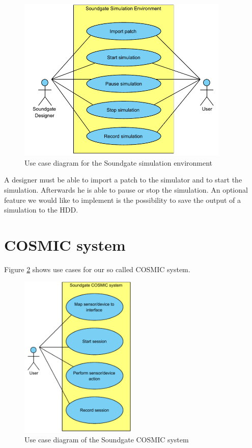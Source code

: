 	\begin{figure}[!h]
		\centering
			\includegraphics[width=0.90\textwidth]{images/Soundgate_Simulator.pdf}
		\caption{Use case diagram for the Soundgate simulation environment}
		\label{fig:Soundgate_Simulator}
	\end{figure}

A designer must be able to import a patch to the simulator and to start the simulation. Afterwards he is able to pause or stop the simulation. An optional feature we would like to implement is the possibility to save the output of a simulation to the HDD.

\section{COSMIC system}
	Figure \ref{fig:Soundgate_UserInterface} shows use cases for our so called \ac{COSMIC} system. 
	
	\begin{figure}[!h]
		\centering
			\includegraphics[width=0.50\textwidth]{images/User_View.pdf}
		\caption{Use case diagram of the Soundgate COSMIC system}
		\label{fig:Soundgate_UserInterface}
	\end{figure}
	
